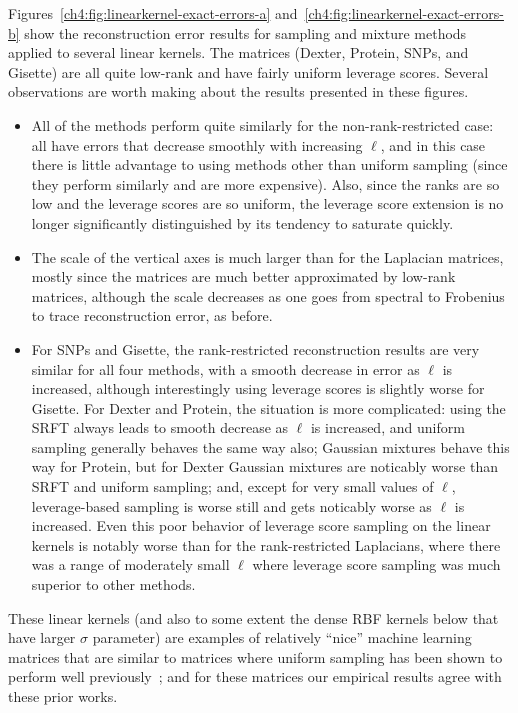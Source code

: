 Figures~\ref{ch4:fig:linearkernel-exact-errors-a} and~\ref{ch4:fig:linearkernel-exact-errors-b}
show the reconstruction error results for sampling and mixture methods 
applied to several linear kernels.  
The matrices (Dexter, Protein, SNPs, and Gisette) are all quite low-rank 
and have fairly uniform leverage scores.
Several observations are worth making about the results presented in these 
figures.
\begin{itemize}
\item
All of the methods perform quite similarly for the non-rank-restricted 
case: all have errors that decrease smoothly with increasing $\ell$, and in 
this case there is little advantage to using methods other than uniform 
sampling (since they perform similarly and are more expensive).
Also, since the ranks are so low and the leverage scores are so uniform, the 
leverage score extension is no longer significantly distinguished by its 
tendency to saturate quickly.
\item
The scale of the vertical axes is much larger than for the Laplacian matrices,
mostly since the matrices are much better approximated by low-rank 
matrices, although the scale decreases as one goes from spectral to 
Frobenius to trace reconstruction error, as before.
\item
For SNPs and Gisette, the rank-restricted reconstruction results are 
very similar for all four methods, with a smooth decrease in error as
$\ell$ is increased, although interestingly using leverage scores is
slightly worse for Gisette.
For Dexter and Protein, the situation is more complicated: using the SRFT 
always leads to smooth decrease as $\ell$ is increased, and uniform sampling
generally behaves the same way also; Gaussian mixtures behave this way 
for Protein, but 
for Dexter Gaussian mixtures are noticably worse than SRFT and uniform 
sampling; and, except for very small values of $\ell$, leverage-based 
sampling is worse still and gets noticably worse as $\ell$ is increased.
Even this poor behavior of leverage score sampling on the linear kernels is 
notably worse than for the rank-restricted Laplacians, where there was a 
range of moderately small $\ell$ where leverage score sampling was much 
superior to other methods.
\end{itemize}
These linear kernels (and also to some extent the dense RBF kernels below
that have larger $\sigma$ parameter) are examples of relatively ``nice'' 
machine learning matrices that are similar to matrices where uniform 
sampling has been shown to perform well 
previously~\cite{TKR08,KMT09a,KMT09,KMT12}; and for these matrices our 
empirical results agree with these prior works.


